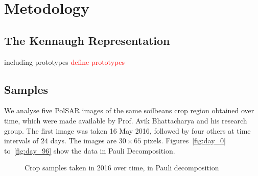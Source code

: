 \documentclass[journal]{IEEEtran}
\begin{document}
\section{Metodology}

\subsection{The Kennaugh Representation}

including prototypes
\textcolor{red}{define prototypes}

\subsection{Samples}

We analyse five PolSAR images of the same soilbeans crop region obtained over time, which were made available by Prof. Avik Bhattacharya and his research group. The first image was taken 16 May 2016, followed by four others at time intervals of $24$ days. The images are $30 \times 65$ pixels.
Figures~\ref{fig:day_0} to~\ref{fig:day_96} show the data in Pauli Decomposition. 

\begin{figure}[hbt]
  \centering
  \caption{Crop samples taken in 2016 over time, in Pauli decomposition}
  \label{fig:sample_images}
\end{figure}
\end{document}
